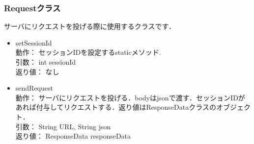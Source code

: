 \documentclass[a4j,titlepage]{jarticle}
\begin{document}
\subsubsection{Requestクラス}
サーバにリクエストを投げる際に使用するクラスです．
\begin{itemize}
\item setSessionId\\
動作： セッションIDを設定するstaticメソッド.\\
引数： int sessionId\\
返り値： なし

\item sendRequest\\
動作： サーバにリクエストを投げる．bodyはjsonで渡す．セッションIDがあれば付与してリクエストする．返り値はResponseDataクラスのオブジェクト．\\
引数： String URL, String json\\
返り値： ResponseData responseData
\end{itemize}
\end{document}

